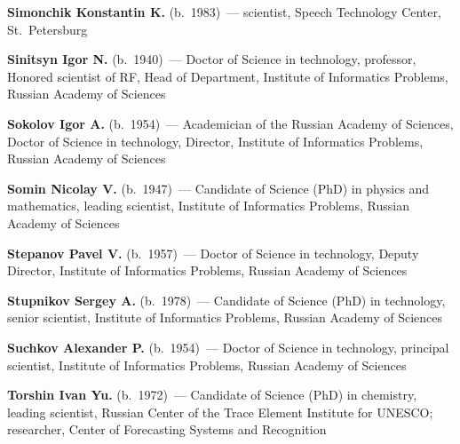 \begin{multicols}{2}
\noindent
\textbf{Simonchik Konstantin K.} (b.\ 1983)~--- scientist, 
 Speech Technology Center, St.~Petersburg

\vspace*{4pt}

\noindent
\textbf{Sinitsyn Igor N.} (b.\ 1940)~--- Doctor of Science in technology,
professor, Honored scientist  of RF,
Head of Department, Institute of Informatics Problems,  Russian Academy of Sciences

\pagebreak

\noindent 
\textbf{Sokolov Igor A.} (b.\ 1954)~--- Academician of the Russian Academy of Sciences,
Doctor of Science in technology, Director,
Institute of Informatics Problems,  Russian Academy of Sciences

\vspace*{4pt}

\def\leftfootline{\small{\textbf{\thepage}
\hfill ИНФОРМАТИКА И ЕЁ ПРИМЕНЕНИЯ\ \ \ том~6\ \ \ выпуск~1\ \ \ 2012}
}%
 \def\rightfootline{\small{ИНФОРМАТИКА И ЕЁ ПРИМЕНЕНИЯ\ \ \ том~6\ \ \ выпуск~1\ \ \ 2012
\hfill \textbf{\thepage}}}

\noindent
\textbf{Somin Nicolay V.} (b.\ 1947)~--- Candidate of Science (PhD) in physics and mathematics, 
leading scientist, Institute of Informatics Problems, Russian Academy of Sciences

\vspace*{4pt}


\noindent
\textbf{Stepanov Pavel V.} (b.\ 1957)~--- Doctor of Science in technology, 
Deputy Director, Institute of Informatics Problems, Russian Academy of Sciences

\vspace*{4pt}


\noindent
\textbf{Stupnikov Sergey A.} (b.\ 1978)~--- Candidate of Science (PhD) in technology, 
senior scientist, Institute of Informatics Problems, Russian Academy of Sciences 

 \vspace*{4pt}

\noindent
\textbf{Suchkov Alexander P.} (b.\ 1954)~--- Doctor of Science in technology, 
principal scientist, Institute of Informatics Problems, Russian Academy of Sciences

\columnbreak

\noindent
\textbf{Torshin Ivan Yu.} (b.\ 1972)~--- Candidate of Science (PhD)
in chemistry, leading scientist, Russian Center of the 
Trace Element Institute for \mbox{UNESCO}; researcher, 
Center of Forecasting Systems and Recognition



\end{multicols}
